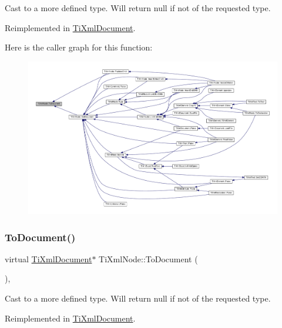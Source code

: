 Cast to a more defined type. Will return null if not of the requested type. 



Reimplemented in \hyperlink{class_ti_xml_document_a468e582640e3c4f740f7168d8b4a6e4a}{Ti\+Xml\+Document}.

Here is the caller graph for this function\+:
\nopagebreak
\begin{figure}[H]
\begin{center}
\leavevmode
\includegraphics[width=350pt]{class_ti_xml_node_a775a904618cad6e4a8049bda4f5a6aa9_icgraph}
\end{center}
\end{figure}
\mbox{\label{class_ti_xml_node_a6a4c8ac28ee7a745d059db6691e03bae}} 
\subsubsection{\texorpdfstring{To\+Document()}{ToDocument()}\hspace{0.1cm}{\footnotesize\ttfamily [2/2]}}
{\footnotesize\ttfamily virtual \hyperlink{class_ti_xml_document}{Ti\+Xml\+Document}$\ast$ Ti\+Xml\+Node\+::\+To\+Document (\begin{DoxyParamCaption}{ }\end{DoxyParamCaption})\hspace{0.3cm}{\ttfamily [inline]}, {\ttfamily [virtual]}}



Cast to a more defined type. Will return null if not of the requested type. 



Reimplemented in \hyperlink{class_ti_xml_document_a1025d942a1f328fd742d545e37efdd42}{Ti\+Xml\+Document}.

